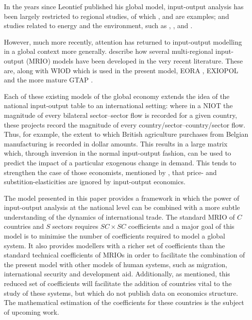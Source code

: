 \documentclass[a4paper]{article}
\begin{document}
In the years since Leontief published his global model, input-output analysis has been largely restricted to regional studies, of which \textcite{akita_interregional_1993}, \textcite{khan_sectoral_1999} and \textcite{luo_power--pull_2013} are examples; and studies related to energy and the environment, such as  \textcite{leontief_environmental_1970}, \textcite{joshi_product_1999}, \textcite{bergh_handbook_2002} and \textcite{hendrickson_environmental_2006}.

However, much more recently, attention has returned to input-output modelling in a global context more generally. \textcite{tukker_global_2013} describe how several multi-regional input-output (MRIO) models have been developed in the very recent literature.
These are, along with WIOD which is used in the present model, EORA \parencite{lenzen_building_2013}, EXIOPOL \parencite{tukker_exiopol_2013} and the more mature GTAP \parencite{walmsley_introduction_2012}.

Each of these existing models of the global economy extends the idea of the national input-output table to an international setting: where in a NIOT the magnitude of every bilateral sector--sector flow is recorded for a given country, these projects record the magnitude of every country/sector--country/sector flow.
Thus, for example, the extent to which British agriculture purchases from Belgian manufacturing is recorded in dollar amounts.
This results in a large matrix which, through inversion in the normal input-output fashion, can be used to predict the impact of a particular exogenous change in demand.
This tends to strengthen the case of those economists, mentioned by \textcite{duchin_international_2004}, that price- and substition-elasticities are ignored by input-output economics.

The model presented in this paper provides a framework in which the power of input-output analysis at the national level can be combined with a more subtle understanding of the dynamics of international trade.
The standard MRIO of $C$ countries and $S$ sectors requires $SC\times SC$ coefficients and a major goal of this model is to minimise the number of coefficients required to model a global system.
It also provides modellers with a richer set of coefficients than the standard technical coefficients of MRIOs in order to facilitate the combination of the present model with other models of human systems, such as migration, international security and development aid. 
Additionally, as mentioned, this reduced set of coefficients will facilitate the addition of countries vital to the study of these systems, but which do not publish data on economics structure.
The mathematical estimation of the coefficients for these countries is the subject of upcoming work.
\end{document}
